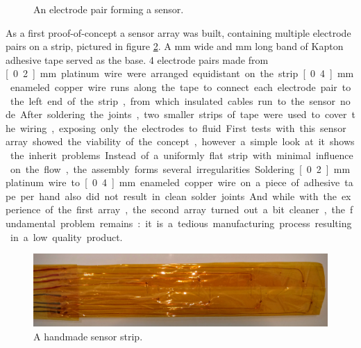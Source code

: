 \begin{figure}[H]
	\begin{center}
		\caption{An electrode pair forming a sensor.}
		\label{fig:sensor}
	\end{center}
\end{figure}

As a first proof-of-concept a sensor array was built, containing multiple electrode pairs on a strip, pictured in figure \ref{fig:v2}. A \unit[50]{mm} wide and \unit[250]{mm} long band of Kapton adhesive tape served as the base. 4 electrode pairs made from \unit[0.2]{mm} platinum wire were arranged equidistant on the strip. \unit[0.4]{mm} enameled copper wire runs along the tape to connect each electrode pair to the left end of the strip, from which insulated cables run to the sensor node. After soldering the joints, two smaller strips of tape were used to cover the wiring, exposing only the electrodes to fluid.

First tests with this sensor array showed the viability of the concept, however a simple look at it shows the inherit problems. Instead of a uniformly flat strip with minimal influence on the flow, the assembly forms several irregularities. Soldering \unit[0.2]{mm} platinum wire to \unit[0.4]{mm} enameled copper wire on a piece of adhesive tape per hand also did not result in clean solder joints. And while with the experience of the first array, the second array turned out a bit cleaner, the fundamental problem remains: it is a tedious manufacturing process resulting in a low quality product.

\begin{figure}
	\begin{center}
		\includegraphics[width=\textwidth]{images/v2.jpg} 
		\caption{A handmade sensor strip.}
		\label{fig:v2}
	\end{center}
\end{figure}

